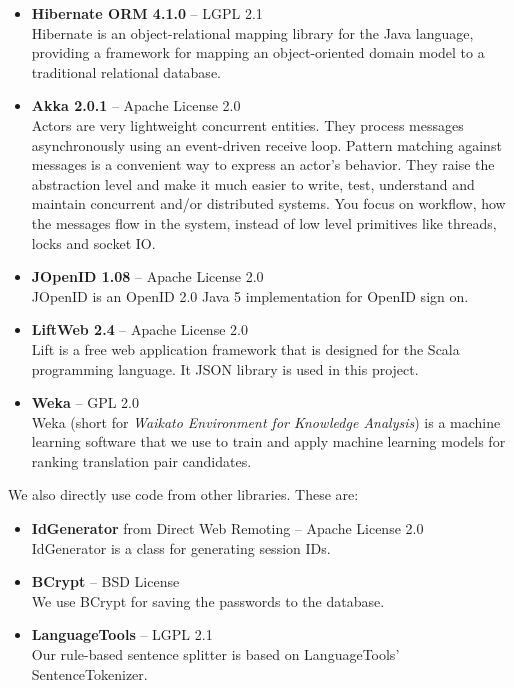\begin{itemize}
\item {\bf Hibernate ORM 4.1.0} -- LGPL 2.1 \\
Hibernate is an object-relational mapping library for the Java language, providing a framework for mapping an object-oriented domain model to a traditional relational database.

\item {\bf Akka 2.0.1} -- Apache License 2.0 \\
Actors are very lightweight concurrent entities. They process messages asynchronously using an event-driven receive loop. Pattern matching against messages is a convenient way to express an actor's behavior. They raise the abstraction level and make it much easier to write, test, understand and maintain concurrent and/or distributed systems. You focus on workflow, how the messages flow in the system, instead of low level primitives like threads, locks and socket IO.
 
\item {\bf JOpenID 1.08} -- Apache License 2.0 \\
JOpenID is an OpenID 2.0 Java 5 implementation for OpenID sign on.

\item {\bf LiftWeb 2.4} -- Apache License 2.0 \\
Lift is a free web application framework that is designed for the Scala programming language. It JSON library is used in this project.

\item {\bf Weka} -- GPL 2.0\\
Weka (short for \emph{Waikato Environment for Knowledge Analysis}) is a machine learning software that we use to train and apply machine learning models for ranking translation pair candidates.
\end{itemize}

We also directly use code from other libraries. These are:

\begin{itemize}
\item {\bf IdGenerator} from Direct Web Remoting -- Apache License 2.0\\
IdGenerator is a class for generating session IDs.

\item {\bf BCrypt} -- BSD License\\
We use BCrypt for saving the passwords to the database.

\item {\bf LanguageTools} -- LGPL 2.1\\
Our rule-based sentence splitter is based on LanguageTools' SentenceTokenizer.

\end{itemize}

